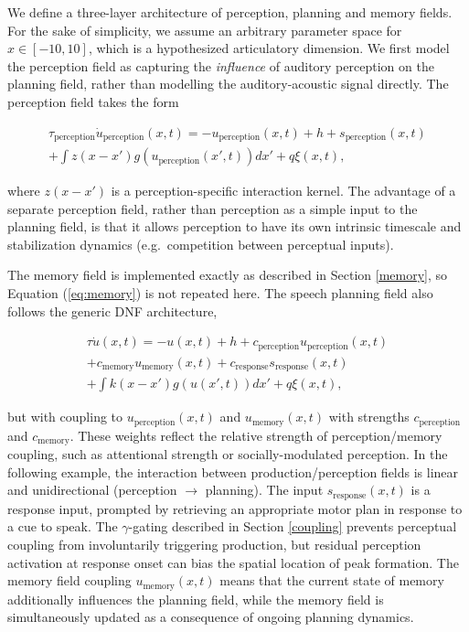 \documentclass[cameraready]{Interspeech}
\begin{document}
We define a three-layer architecture of perception, planning and memory fields. For the sake of simplicity, we assume an arbitrary parameter space for $x \in [-10, 10]$, which is a hypothesized articulatory dimension. We first model the perception field as capturing the \textit{influence} of auditory perception on the planning field, rather than modelling the auditory-acoustic signal directly. The perception field takes the form

\begin{multline}
\tau_{\text{perception}}\dot{u}_{\text{perception}}(x,t)  = -u_{\text{perception}}(x,t) + h + s_{\text{perception}}(x,t)
\\
+ \int z(x-x') g(u_{\text{perception}}(x',t))dx' + q\xi(x,t),
\label{eq:perception}
\end{multline}

where $z(x-x')$ is a perception-specific interaction kernel. The advantage of a separate perception field, rather than perception as a simple input to the planning field, is that it allows perception to have its own intrinsic timescale and stabilization dynamics (e.g.~competition between perceptual inputs).

The memory field is implemented exactly as described in Section \ref{memory}, so Equation (\ref{eq:memory}) is not repeated here. The speech planning field also follows the generic DNF architecture,

\begin{multline}
\tau \dot{u}(x,t) = -u(x,t) + h + c_{\text{perception}} u_{\text{perception}}(x,t)
\\
+ c_{\text{memory}} u_{\text{memory}}(x,t) + c_{\text{response}}s_{\text{response}}(x,t)
\\
+ \int k(x-x') g(u(x',t))dx' + q\xi(x,t),
\label{eq:planning}
\end{multline}

but with coupling to $u_{\text{perception}}(x,t)$ and $u_{\text{memory}}(x,t)$ with strengths $c_{\text{perception}}$ and $c_{\text{memory}}$. These weights reflect the relative strength of perception/memory coupling, such as attentional strength or socially-modulated perception. In the following example, the interaction between production/perception fields is linear and unidirectional (perception $\rightarrow$ planning). The input $s_{\text{response}}(x,t)$ is a response input, prompted by retrieving an appropriate motor plan in response to a cue to speak. The $\gamma$-gating described in Section \ref{coupling} prevents perceptual coupling from involuntarily triggering production, but residual perception activation at response onset can bias the spatial location of peak formation. The memory field coupling $u_{\text{memory}}(x,t)$ means that the current state of memory additionally influences the planning field, while the memory field is simultaneously updated as a consequence of ongoing planning dynamics.
 
\end{document}
